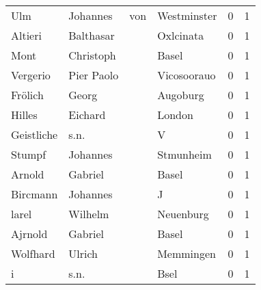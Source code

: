 \begin{center}
\begin{tiny}
\begin{longtabu}{llllrr}
                      Ulm &                           Johannes &         von &                                 Westminster &          0 &         1 \\
                  Altieri &                          Balthasar &             &                                   Oxlcinata &          0 &         1 \\
                     Mont &                          Christoph &             &                                       Basel &          0 &         1 \\
                 Vergerio &                         Pier Paolo &             &                                 Vicosoorauo &          0 &         1 \\
                  Frölich &                              Georg &             &                                    Augoburg &          0 &         1 \\
                   Hilles &                            Eichard &             &                                      London &          0 &         1 \\
               Geistliche &                               s.n. &             &                                           V &          0 &         1 \\
                   Stumpf &                           Johannes &             &                                   Stmunheim &          0 &         1 \\
                   Arnold &                            Gabriel &             &                                       Basel &          0 &         1 \\
                 Bircmann &                           Johannes &             &                                           J &          0 &         1 \\
                    larel &                            Wilhelm &             &                                   Neuenburg &          0 &         1 \\
                  Ajrnold &                            Gabriel &             &                                       Basel &          0 &         1 \\
                 Wolfhard &                             Ulrich &             &                                   Memmingen &          0 &         1 \\
                        i &                               s.n. &             &                                        Bsel &          0 &         1 \\

\end{longtabu}
\end{tiny}
\end{center}
